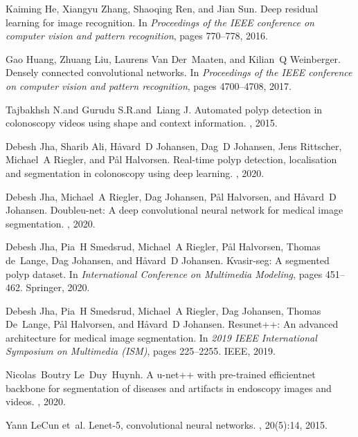 \documentclass{article}
\begin{document}
\begin{thebibliography}{10}
Kaiming He, Xiangyu Zhang, Shaoqing Ren, and Jian Sun.
\newblock Deep residual learning for image recognition.
\newblock In {\em Proceedings of the IEEE conference on computer vision and
  pattern recognition}, pages 770--778, 2016.

Gao Huang, Zhuang Liu, Laurens Van Der~Maaten, and Kilian~Q Weinberger.
\newblock Densely connected convolutional networks.
\newblock In {\em Proceedings of the IEEE conference on computer vision and
  pattern recognition}, pages 4700--4708, 2017.

Tajbakhsh N.and Gurudu S.R.and~Liang J.
\newblock Automated polyp detection in colonoscopy videos using shape and
  context information.
, 2015.

Debesh Jha, Sharib Ali, H{\aa}vard~D Johansen, Dag~D Johansen, Jens Rittscher,
  Michael~A Riegler, and P{\aa}l Halvorsen.
\newblock Real-time polyp detection, localisation and segmentation in
  colonoscopy using deep learning.
, 2020.

Debesh Jha, Michael~A Riegler, Dag Johansen, P{\aa}l Halvorsen, and
  H{\aa}vard~D Johansen.
\newblock Doubleu-net: A deep convolutional neural network for medical image
  segmentation.
, 2020.

Debesh Jha, Pia~H Smedsrud, Michael~A Riegler, P{\aa}l Halvorsen, Thomas
  de~Lange, Dag Johansen, and H{\aa}vard~D Johansen.
\newblock Kvasir-seg: A segmented polyp dataset.
\newblock In {\em International Conference on Multimedia Modeling}, pages
  451--462. Springer, 2020.

Debesh Jha, Pia~H Smedsrud, Michael~A Riegler, Dag Johansen, Thomas De~Lange,
  P{\aa}l Halvorsen, and H{\aa}vard~D Johansen.
\newblock Resunet++: An advanced architecture for medical image segmentation.
\newblock In {\em 2019 IEEE International Symposium on Multimedia (ISM)}, pages
  225--2255. IEEE, 2019.

Nicolas~Boutry Le~Duy~Huynh.
\newblock A u-net++ with pre-trained efficientnet backbone for segmentation of
  diseases and artifacts in endoscopy images and videos.
, 2020.

Yann LeCun et~al.
\newblock Lenet-5, convolutional neural networks.
, 20(5):14, 2015.


\end{thebibliography}
\end{document}
